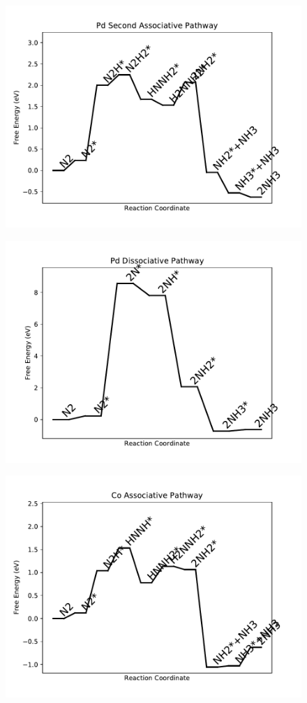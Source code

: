 \begin{figure}
\includegraphics[width=0.8\linewidth]{data/plots/Pd_associative_2.pdf}
\label{fig:Pd_associative_2}
\end{figure}

\begin{figure}
\includegraphics[width=0.8\linewidth]{data/plots/Pd_dissociative.pdf}
\label{fig:Pd_dissociative}
\end{figure}

\begin{figure}
\includegraphics[width=0.8\linewidth]{data/plots/Co_associative.pdf}
\label{fig:Co_associative}
\end{figure}

